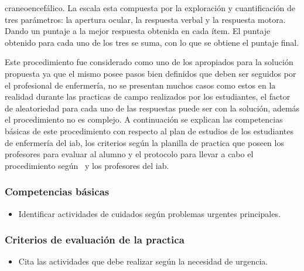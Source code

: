  craneoencefálico. La escala esta compuesta por
la exploración y cuantificación de tres parámetros: la apertura ocular, la
respuesta verbal y la respuesta motora. Dando un puntaje a la mejor respuesta
obtenida en cada ítem. El puntaje obtenido para cada uno de los tres se suma,
con lo que se obtiene el puntaje final.

Este procedimiento fue considerado como uno de los apropiados para la solución
propuesta ya que el mismo posee pasos bien definidos que deben ser seguidos por
el profesional de enfermería, no se presentan muchos casos como estos en la
realidad durante las practicas de campo realizados por los estudiantes, el
factor de aleatoriedad para cada uno de las respuestas puede ser
 con la solución, además el
procedimiento no es complejo. A continuación se explican las competencias
básicas de este procedimiento con respecto al plan de estudios de los
estudiantes de enfermería del \Gls{iab}, los criterios según la planilla de
practica que poseen los profesores para evaluar al alumno y el protocolo para
llevar a cabo el procedimiento según~\cite{protocolo} y los profesores del
\Gls{iab}.

\subsubsection{Competencias básicas}
\begin{itemize}
\item Identificar actividades de cuidados según problemas urgentes principales.
\end{itemize}

\subsubsection{Criterios de evaluación de la practica}
\begin{itemize}
\item Cita las actividades que debe realizar según la necesidad de urgencia.
\end{itemize}

